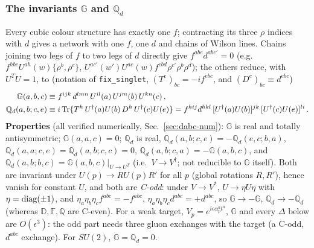 \documentclass[10pt]{article}
\def\mf#1{\mathbb{#1}}
\begin{document}
\subsubsection{The invariants $\mf{G}$ and $\mf{Q}_{d}$}\label{sec:dabc-inv}
\noindent Every cubic colour structure has exactly one $f$; contracting its three $\rho$ indices with $d$ gives a network with one $f$, one $d$ and chains of Wilson lines. Chains joining two legs of $f$ to two legs of $d$ directly give $f^{abe}d^{abe'}=0$ (e.g.\ $f^{hbc}U^{ah}(w)\{\rho^{b},\rho^{c}\}$, $U^{ac'}(w')U^{ac}(w)f^{cbd}\rho^{c'}\rho^{b}\rho^{d}$); the others reduce, with $U^{T}U=1$, to (notation of \texttt{fix\_singlet}, $(T^{e})_{bc}=-if^{ebc}$, and $(D^{e})_{bc}\equiv d^{ebc}$)
\begin{align}
\mf{G}(a,b,c)&\equiv f^{ijk}\,d^{lmn}\,U^{il}(a)\,U^{jm}(b)\,U^{kn}(c)\,,\notag\\
\mf{Q}_{d}(a,b;c,e)&\equiv i\,{\rm Tr}\{T^{h}\,U^{\dagger}(a)U(b)\,D^{h}\,U^{\dagger}(c)U(e)\}=f^{hij}d^{hkl}\,[U^{\dagger}(a)U(b)]^{jk}\,[U^{\dagger}(c)U(e)]^{li}\,.\label{eq:dabc-GQ}
\end{align}
\textbf{Properties} (all verified numerically, Sec.~\ref{sec:dabc-num}): $\mf{G}$ is real and totally antisymmetric; $\mf{G}(a,a,c)=0$; $\mf{Q}_{d}$ is real, $\mf{Q}_{d}(a,b;c,e)=-\mf{Q}_{d}(e,c;b,a)$, $\mf{Q}_{d}(a,a;c,e)=\mf{Q}_{d}(a,b;c,c)=0$, $\mf{Q}_{d}(a,b;c,a)=-\mf{G}(a,b,c)$, and $\mf{Q}_{d}(a,b;b,c)=\mf{G}(a,b,c)|_{U\to U^{T}}$ (i.e.\ $V\to V^{\dagger}$; not reducible to $\mf{G}$ itself). Both are invariant under $U(p)\to RU(p)R'$ for all $p$ (global rotations $R,R'$), hence vanish for constant $U$, and both are \emph{C-odd}: under $V\to V^{*}$, $U\to\eta U\eta$ with $\eta={\rm diag}(\pm1)$, and $\eta_{a}\eta_{b}\eta_{c}f^{abc}=-f^{abc}$, $\eta_{a}\eta_{b}\eta_{c}d^{abc}=+d^{abc}$, so $\mf{G}\to-\mf{G}$, $\mf{Q}_{d}\to-\mf{Q}_{d}$ (whereas $\mf{D},\mf{F},\mf{Q}$ are C-even). For a weak target, $V_{p}=e^{i\epsilon\alpha_{p}^{a}t^{a}}$, $\mf{G}$ and every $\Delta$ below are $O(\epsilon^{3})$: the odd part needs three gluon exchanges with the target (a C-odd, $d^{abc}$ exchange). For $SU(2)$, $\mf{G}=\mf{Q}_{d}=0$.
\end{document}
